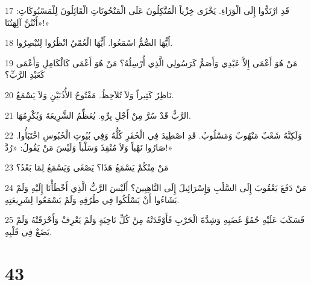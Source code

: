 \par 17 قَدِ ارْتَدُّوا إِلَى الْوَرَاءِ. يَخْزَى خِزْياً الْمُتَّكِلُونَ عَلَى الْمَنْحُوتَاتِ الْقَائِلُونَ لِلْمَسْبُوكَاتِ: «أَنْتُنَّ آلِهَتُنَا!»
\par 18 أَيُّهَا الصُّمُّ اسْمَعُوا. أَيُّهَا الْعُمْيُ انْظُرُوا لِتُبْصِرُوا.
\par 19 مَنْ هُوَ أَعْمَى إِلاَّ عَبْدِي وَأَصَمُّ كَرَسُولِي الَّذِي أُرْسِلُهُ؟ مَنْ هُوَ أَعْمَى كَالْكَامِلِ وَأَعْمَى كَعَبْدِ الرَّبِّ؟
\par 20 نَاظِرٌ كَثِيراً وَلاَ تُلاَحِظُ. مَفْتُوحُ الأُذُنَيْنِ وَلاَ يَسْمَعُ.
\par 21 الرَّبُّ قَدْ سُرَّ مِنْ أَجْلِ بِرِّهِ. يُعَظِّمُ الشَّرِيعَةَ وَيُكْرِمُهَا.
\par 22 وَلَكِنَّهُ شَعْبٌ مَنْهُوبٌ وَمَسْلُوبٌ. قَدِ اصْطِيدَ فِي الْحُفَرِ كُلُّهُ وَفِي بُيُوتِ الْحُبُوسِ اخْتَبَأُوا. صَارُوا نَهْباً وَلاَ مُنْقِذَ وَسَلْباً وَلَيْسَ مَنْ يَقُولُ: «رُدَّ!»
\par 23 مَنْ مِنْكُمْ يَسْمَعُ هَذَا؟ يَصْغَى وَيَسْمَعُ لِمَا بَعْدُ؟
\par 24 مَنْ دَفَعَ يَعْقُوبَ إِلَى السَّلْبِ وَإِسْرَائِيلَ إِلَى النَّاهِبِينَ؟ أَلَيْسَ الرَّبُّ الَّذِي أَخْطَأْنَا إِلَيْهِ وَلَمْ يَشَاءُوا أَنْ يَسْلُكُوا فِي طُرُقِهِ وَلَمْ يَسْمَعُوا لِشَرِيعَتِهِ.
\par 25 فَسَكَبَ عَلَيْهِ حُمُوَّ غَضَبِهِ وَشِدَّةَ الْحَرْبِ فَأَوْقَدَتْهُ مِنْ كُلِّ نَاحِيَةٍ وَلَمْ يَعْرِفْ وَأَحْرَقَتْهُ وَلَمْ يَضَعْ فِي قَلْبِهِ.

\chapter{43}


